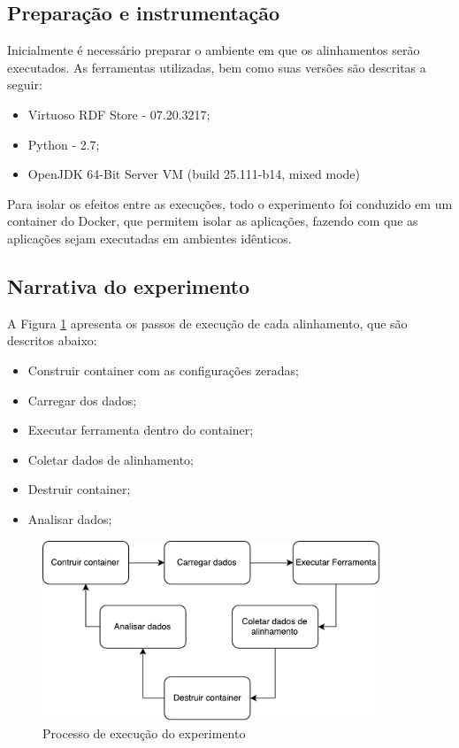 \subsection*{Preparação e instrumentação}
Inicialmente é necessário preparar o ambiente em que os alinhamentos serão executados. As ferramentas utilizadas, bem como suas versões são descritas a seguir:

\begin{itemize}
\item Virtuoso RDF Store - 07.20.3217;
\item Python - 2.7;
\item OpenJDK 64-Bit Server VM (build 25.111-b14, mixed mode)

\end{itemize}

Para isolar os efeitos entre as execuções, todo o experimento foi conduzido em um container do Docker, que permitem isolar as aplicações, fazendo com que as aplicações sejam executadas em ambientes idênticos.

\subsection*{Narrativa do experimento}
A Figura \ref{fig:experiment} apresenta os passos de execução de cada alinhamento, que são descritos abaixo:
\begin{itemize}
\item Construir container com as configurações zeradas;
\item Carregar dos dados;
\item Executar ferramenta dentro do container;
\item Coletar dados de alinhamento;
\item Destruir container;
\item Analisar dados;
\end{itemize}

\begin{figure}[h]
	\centering
	\includegraphics[width=0.9\textwidth]{./imagens/experimento.pdf}
    \caption{Processo de execução do experimento}
	\label{fig:experiment}
\end{figure}

